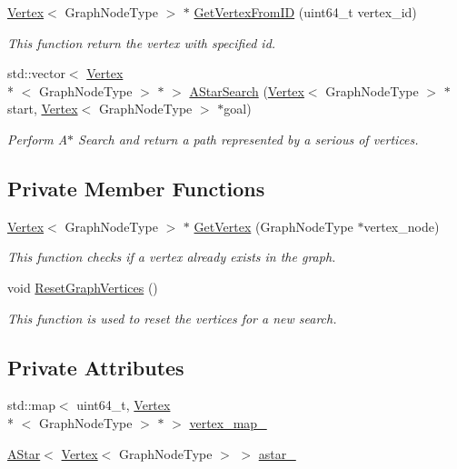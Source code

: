 \begin{DoxyCompactItemize}
\hyperlink{classsrcl__ctrl_1_1Vertex}{Vertex}$<$ Graph\-Node\-Type $>$ $\ast$ \hyperlink{classsrcl__ctrl_1_1Graph_abde35d17a81abb8cc985bd155c3cb390}{Get\-Vertex\-From\-I\-D} (uint64\-\_\-t vertex\-\_\-id)
\begin{DoxyCompactList}\small\item\em This function return the vertex with specified id. \end{DoxyCompactList}\item 
std\-::vector$<$ \hyperlink{classsrcl__ctrl_1_1Vertex}{Vertex}\\*
$<$ Graph\-Node\-Type $>$ $\ast$ $>$ \hyperlink{classsrcl__ctrl_1_1Graph_aa1904470ed153dafd271961b5abee9e3}{A\-Star\-Search} (\hyperlink{classsrcl__ctrl_1_1Vertex}{Vertex}$<$ Graph\-Node\-Type $>$ $\ast$start, \hyperlink{classsrcl__ctrl_1_1Vertex}{Vertex}$<$ Graph\-Node\-Type $>$ $\ast$goal)
\begin{DoxyCompactList}\small\item\em Perform A$\ast$ Search and return a path represented by a serious of vertices. \end{DoxyCompactList}\end{DoxyCompactItemize}
\subsection*{Private Member Functions}
\begin{DoxyCompactItemize}
\item 
\hyperlink{classsrcl__ctrl_1_1Vertex}{Vertex}$<$ Graph\-Node\-Type $>$ $\ast$ \hyperlink{classsrcl__ctrl_1_1Graph_a42096ac188347b7b978db6cc5da1fec3}{Get\-Vertex} (Graph\-Node\-Type $\ast$vertex\-\_\-node)
\begin{DoxyCompactList}\small\item\em This function checks if a vertex already exists in the graph. \end{DoxyCompactList}\item 
void \hyperlink{classsrcl__ctrl_1_1Graph_adc1fcd601227c25acfaf1d8f3ca6ba96}{Reset\-Graph\-Vertices} ()
\begin{DoxyCompactList}\small\item\em This function is used to reset the vertices for a new search. \end{DoxyCompactList}\end{DoxyCompactItemize}
\subsection*{Private Attributes}
\begin{DoxyCompactItemize}
\item 
std\-::map$<$ uint64\-\_\-t, \hyperlink{classsrcl__ctrl_1_1Vertex}{Vertex}\\*
$<$ Graph\-Node\-Type $>$ $\ast$ $>$ \hyperlink{classsrcl__ctrl_1_1Graph_a0cdf1fbe36941c5fabc5b2f2c6bfa2ce}{vertex\-\_\-map\-\_\-}
\item 
\hyperlink{classsrcl__ctrl_1_1AStar}{A\-Star}$<$ \hyperlink{classsrcl__ctrl_1_1Vertex}{Vertex}$<$ Graph\-Node\-Type $>$ $>$ \hyperlink{classsrcl__ctrl_1_1Graph_afb3a6e5c667c05f3edfc87f1ea39577d}{astar\-\_\-}
\end{DoxyCompactItemize}


